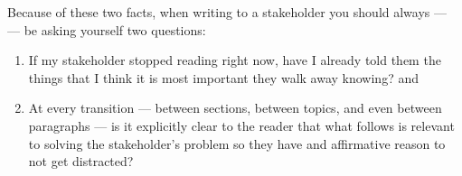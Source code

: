 \documentclass[letterpaper,10pt,english]{jupyterBook}
\begin{document}
\sphinxAtStartPar
Because of these two facts, when writing to a stakeholder you should always —  — be asking yourself two questions:
\begin{enumerate}
%
\item {} 
\sphinxAtStartPar
If my stakeholder stopped reading right now, have I already told them the things that I think it is most important they walk away knowing? and

\item {} 
\sphinxAtStartPar
At every transition — between sections, between topics, and even between paragraphs — is it explicitly clear to the reader that what follows is relevant to solving the stakeholder’s problem so they have and affirmative reason to not get distracted?

\end{enumerate}
\end{document}

